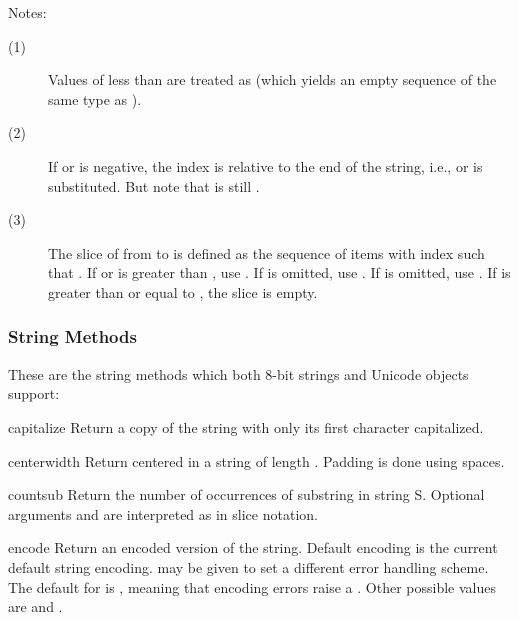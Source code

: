 \noindent
Notes:

\begin{description}
\item[(1)] Values of  less than  are treated as
   (which yields an empty sequence of the same type as
  ).

\item[(2)] If  or  is negative, the index is relative to
  the end of the string, i.e.,  or
   is substituted.  But note that  is
  still .
  
\item[(3)] The slice of  from  to  is defined as
  the sequence of items with index  such that .  If  or  is greater than
  , use .  If  is omitted,
  use .  If  is omitted, use .  If
   is greater than or equal to , the slice is empty.
\end{description}


\subsubsection{String Methods \label{string-methods}}

These are the string methods which both 8-bit strings and Unicode
objects support:

\begin{methoddesc}[string]{capitalize}{}
Return a copy of the string with only its first character capitalized.
\end{methoddesc}

\begin{methoddesc}[string]{center}{width}
Return centered in a string of length . Padding is done
using spaces.
\end{methoddesc}

\begin{methoddesc}[string]{count}{sub}
Return the number of occurrences of substring  in string
S.  Optional arguments  and
 are interpreted as in slice notation.
\end{methoddesc}

\begin{methoddesc}[string]{encode}{}
Return an encoded version of the string.  Default encoding is the current
default string encoding.   may be given to set a different
error handling scheme.  The default for  is
, meaning that encoding errors raise a
.  Other possible values are  and
.
\end{methoddesc}

